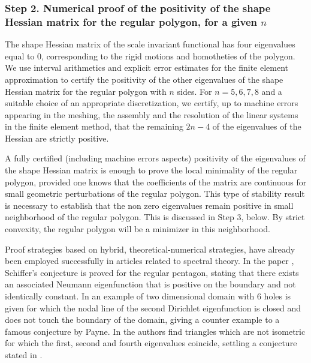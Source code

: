 \subsubsection*{Step 2. Numerical proof of the positivity of the shape Hessian matrix for the regular polygon, for a given $n$}
The shape Hessian matrix of the scale invariant functional has four eigenvalues equal to $0$, corresponding to the rigid motions and homotheties of the polygon.
We use interval arithmetics and explicit error estimates for the finite element approximation to certify the positivity of the other eigenvalues of the shape Hessian matrix for the regular polygon with $n$ sides. For $n=5,6,7,8$ and a suitable choice of an appropriate discretization, we certify, up to machine errors appearing in the meshing, the assembly and the resolution of the linear systems in the finite element method, that the remaining $2n-4$ of the eigenvalues of the Hessian are strictly positive.

A fully certified (including machine errors aspects) positivity of the eigenvalues of the shape Hessian matrix is enough to prove the local minimality of the regular polygon, provided one knows that the coefficients of the matrix are continuous for small geometric perturbations of the regular polygon. This type of stability result is necessary to establish that the non zero eigenvalues remain positive in small neighborhood of the regular polygon. This is discussed in Step 3, below. By strict convexity, the regular polygon will be a minimizer in this neighborhood.

{Proof strategies based on hybrid, theoretical-numerical strategies, have already been employed successfully in articles related to spectral theory. In the paper \cite{schiffer}, Schiffer's conjecture is proved for the regular pentagon, stating that there exists an associated Neumann eigenfunction that is positive on the boundary and not identically constant. In \cite{dahne-payne} an example of two dimensional domain with $6$ holes is given for which the nodal line of the second Dirichlet eigenfunction is closed and does not touch the boundary of the domain, giving a counter example to a famous conjecture by Payne. In \cite{three_eigs_triangle} the authors find triangles which are not isometric for which the first, second and fourth eigenvalues coincide, settling a conjecture stated in \cite{AFpolygons}.}

